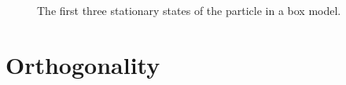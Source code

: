 \begin{figure}[!h]
	\centering
	\subfloat[]{\texttt{[image: ss-1]}}
	\subfloat[]{\texttt{[image: ss-2]}}
	\subfloat[]{\texttt{[image: ss-3]}}
	\caption{The first three stationary states of the particle in a box model.}
	\label{fig:ss-box}
\end{figure}


\section{Orthogonality}

